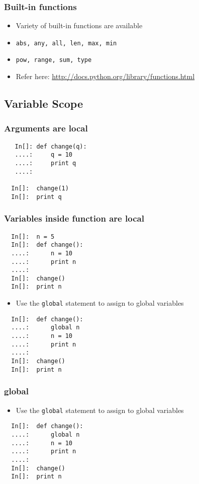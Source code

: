 \begin{frame}[fragile]
  \frametitle{Built-in functions}
  \begin{itemize}
  \item Variety of built-in functions are available
  \item \texttt{abs, any, all, len, max, min}
  \item \texttt{pow, range, sum, type}
  \item Refer here:
    \url{http://docs.python.org/library/functions.html}
  \end{itemize}
\end{frame}

\subsection*{Variable Scope}

\begin{frame}[fragile]
  \frametitle{Arguments are local}
  \begin{lstlisting}
   In[]: def change(q):
   ....:     q = 10
   ....:     print q
   ....:

  In[]:  change(1)
  In[]:  print q
  \end{lstlisting}
\end{frame}

\begin{frame}[fragile]
  \frametitle{Variables inside function are local}
  \begin{lstlisting}
  In[]:  n = 5
  In[]:  def change():
  ....:      n = 10
  ....:      print n
  ....:
  In[]:  change()
  In[]:  print n
  \end{lstlisting}
  \begin{itemize}
  \item Use the \texttt{global} statement to assign to global variables
  \end{itemize}
  \begin{lstlisting}
  In[]:  def change():
  ....:      global n
  ....:      n = 10
  ....:      print n
  ....:
  In[]:  change()
  In[]:  print n
  \end{lstlisting}
\end{frame}

\begin{frame}[fragile]
  \frametitle{global}
 \begin{itemize}
  \item Use the \texttt{global} statement to assign to global variables
  \end{itemize}
  \begin{lstlisting}
  In[]:  def change():
  ....:      global n
  ....:      n = 10
  ....:      print n
  ....:
  In[]:  change()
  In[]:  print n
  \end{lstlisting}
\end{frame}  


